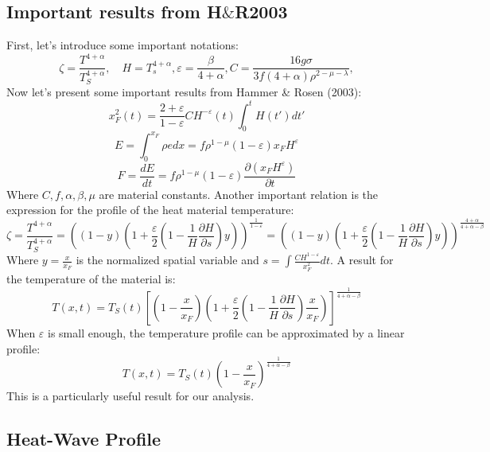 \documentclass{article}
\begin{document}
\subsection*{Important results from H$\&$R2003}
First, let's introduce some important notations: 
\begin{equation}
    \zeta = \frac{T^{4+\alpha}}{T_S^{4+\alpha}}, \quad H = T_s^{4+\alpha}, \varepsilon = \frac{\beta}{4+\alpha}, C = \frac{16g\sigma}{3f(4+\alpha)\rho^{2-\mu-\lambda}},
\end{equation}
Now let's present some important results from Hammer \& Rosen (2003):
\begin{equation}
    x_F^2(t) = \frac{2+\varepsilon}{1-\varepsilon} C H^{-\varepsilon}(t) \int_0^t H(t') dt'
\end{equation}
\begin{equation}
    E = \int_0^{x_F}\rho e dx = f \rho^{1-\mu}(1-\varepsilon) x_F H^{\varepsilon}
\end{equation}
\begin{equation}
    F = \frac{dE}{dt} = f \rho^{1-\mu} (1-\varepsilon) \frac{\partial (x_FH^{\varepsilon})}{ \partial t}
\end{equation}
Where \(C, f, \alpha, \beta, \mu\) are material constants. Another important relation is the expression for the profile of the heat material temperature:
\begin{equation} 
    \zeta = \frac{T^{4+\alpha}}{T_S^{4+\alpha}} = ((1-y)(1+\frac{\varepsilon}{2}(1-\frac{1}{H}\frac{\partial H}{\partial s})y))^{\frac{1}{1-\varepsilon}} = ((1-y)(1+\frac{\varepsilon}{2}(1-\frac{1}{H}\frac{\partial H}{\partial s})y))^{\frac{4+\alpha}{4+\alpha-\beta}}
\end{equation}
Where \(y = \frac{x}{x_F}\) is the normalized spatial variable and $ s = \int \frac{CH^{1-\varepsilon}}{x_F^2} dt$. A result for the temperature of the material is:
\begin{equation}
    T(x,t) = T_S(t) \left[\left(1-\frac{x}{x_F}\right)\left(1+\frac{\varepsilon}{2}(1-\frac{1}{H}\frac{\partial H}{\partial s})\frac{x}{x_F}\right)\right]^{\frac{1}{4+\alpha-\beta}}
\end{equation}
When $\varepsilon$ is small enough, the temperature profile can be approximated by a linear profile:
\begin{equation}
    T(x,t) = T_S(t) (1-\frac{x}{x_F})^{\frac{1}{4+\alpha-\beta}}
\end{equation}
This is a particularly useful result for our analysis.

\subsection{Heat-Wave Profile}
\end{document}
